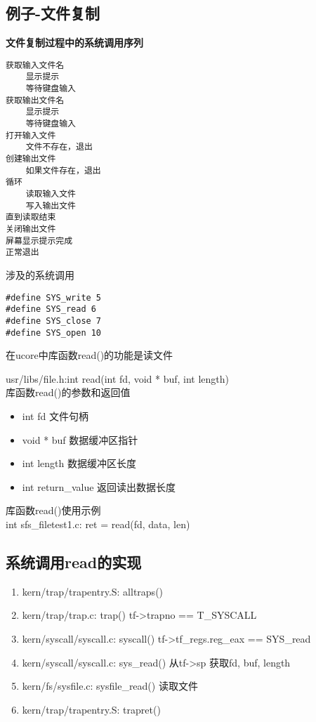 \subsection{例子-文件复制}
\textbf{文件复制过程中的系统调用序列}
\begin{lstlisting}
获取输入文件名
	显示提示
	等待键盘输入
获取输出文件名
	显示提示
	等待键盘输入
打开输入文件
	文件不存在，退出
创建输出文件
	如果文件存在，退出
循环
	读取输入文件
	写入输出文件
直到读取结束
关闭输出文件
屏幕显示提示完成
正常退出
\end{lstlisting}
涉及的系统调用
\begin{lstlisting}
#define SYS_write 5
#define SYS_read 6
#define SYS_close 7
#define SYS_open 10
\end{lstlisting}
在ucore中库函数read()的功能是读文件
\par usr/libs/file.h:int read(int fd, void * buf, int length)\\
库函数read()的参数和返回值
\begin{itemize}
	\item int fd 文件句柄
	\item void * buf 数据缓冲区指针
	\item int length 数据缓冲区长度
	\item int return\_value 返回读出数据长度
\end{itemize}
库函数read()使用示例\\
int sfs\_filetest1.c: ret = read(fd, data, len)
\subsection{系统调用read的实现}
\begin{enumerate}
	\item kern/trap/trapentry.S: alltraps()
	\item kern/trap/trap.c: trap()
	\subitem tf->trapno == T\_SYSCALL
	\item kern/syscall/syscall.c: syscall()
	\subitem tf->tf\_regs.reg\_eax == SYS\_read
	\item kern/syscall/syscall.c: sys\_read()
	\subitem 从tf->sp 获取fd, buf, length
	\item kern/fs/sysfile.c: sysfile\_read()
	\subitem 读取文件
	\item kern/trap/trapentry.S: trapret()
\end{enumerate}
